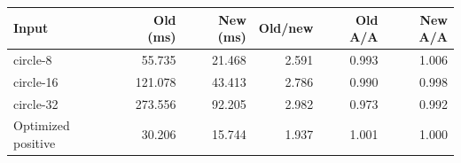 \begin{tabular}{lrrrrr}
\toprule
Input & Old (ms) & New (ms) & Old/new & Old A/A & New A/A \\
\midrule
circle-8 & 55.735 & 21.468 & 2.591 & 0.993 & 1.006 \\
circle-16 & 121.078 & 43.413 & 2.786 & 0.990 & 0.998 \\
circle-32 & 273.556 & 92.205 & 2.982 & 0.973 & 0.992 \\
Optimized positive & 30.206 & 15.744 & 1.937 & 1.001 & 1.000 \\
\bottomrule
\end{tabular}
